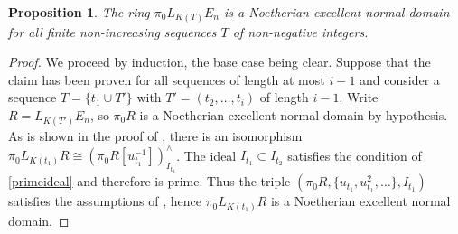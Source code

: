 \documentclass[oneside]{amsart}
\newtheorem{prop}[thm]{Proposition}
\theoremstyle{definition}
\theoremstyle{remark}
\newtheorem{rem}[thm]{Remark}
\theoremstyle{theorem}
\numberwithin{equation}{section}
\begin{document}
\begin{prop}\label{prop:lt}
The ring $\pi_0L_{K(T)}E_n$ is a Noetherian excellent normal domain for all finite non-increasing sequences $T$ of non-negative integers. 
\end{prop}
\begin{proof}
We proceed by induction, the base case being clear. Suppose that the claim has been proven for all sequences of length at most $i-1$ and consider a sequence $T = \{t_1 \cup T'\}$ with $T' = (t_2, \ldots, t_i)$ of length $i-1$. Write $R = L_{K(T')}E_n$, so $\pi_0R$ is a Noetherian excellent normal domain by hypothesis. As is shown in the proof of , there is an isomorphism $\pi_0L_{K(t_1)}R \cong (\pi_0R[u_{t_1}^{-1}])_{I_{t_1}}^{\wedge}$. The ideal $I_{t_1} \subset I_{t_{2}}$ satisfies the condition of \cref{primeideal} and therefore is prime. Thus the triple $(\pi_0R,\{u_{t_1},u_{t_1}^2,\ldots\}, I_{t_1})$ satisfies the assumptions of , hence $\pi_0L_{K(t_1)}R$ is a Noetherian excellent normal domain.
\begin{comment}
Since $\pi_0 E_n \cong W(k)\llbracket u_1, \ldots, u_{n-1} \rrbracket$ is a Noetherian excellent normal domain, $\ref{prop:normal}$ guarantees that the result of iterated localizations and completions is a Noetherian excellent normal domain. 
\end{comment}
\begin{comment}
We proceed by induction, the base case being clear. Suppose that the claim has been proven for all sequences of length at most $i-1$ and consider a sequence $T = \{t\} \cup T'$ with $T'$ of length $i-1$. Write $R = L_{K(T')}E_n$, so $\pi_0R$ is an excellent domain by hypothesis. As is shown in the proof of \Cref{lem:flatlt}, there is an isomorphism $\pi_0L_{K(t)}R \cong (\pi_0R[u_{t}^{-1}])_{I_{t}}^{\wedge}$. The triple $(\pi_0R,\{u_{t},u_{t}^2,\ldots\}, I_t)$ satisfies the assumptions of \Cref{prop:normal}, hence $\pi_0L_{K(t)}R$ is a normal Noetherian ring. Furthermore, 
\[
(\pi_0L_{K(t)}R)/I_t \cong \pi_0R/I_t[u_t^{-1}]
\]
is a domain and thus connected, so \Cref{cor:domain} implies that $\pi_0L_{K(t)}R$ is in fact an integral domain. Finally, $\pi_0L_{K(t)}R$ is excellent as the completion of an excellent ring, by a theorem of Gabber--Kurano--Shimomoto \cite{completionexcellent}.  
\end{comment}
\end{proof}

\begin{comment}
Observe that this proof also gives a formula for the coefficients of $L_{K(T)}E_n$ for any finite sequence $T$ of non-negative integers. 

\begin{rem}
In general, as shown by Nishimura \cite{nishimura} and later by Dumitrescu \cite{dumitrescu}, the completion of a $G$-ring is not necessarily a $G$-ring, see also \cite[Tag 07PW]{stacks-project}. This justifies working with excellent rings rather than merely $G$-rings throughout this note. 
\end{rem}
\end{comment}
\end{document}
